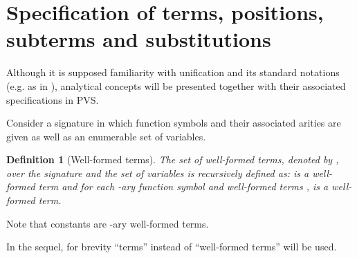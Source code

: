 \documentclass[submission,copyright,creativecommons]{eptcs}
\newtheorem{definition}{Definition}
\begin{document}
\section{Specification of terms, positions, subterms and
  substitutions}\label{Sec:specification}

Although it is supposed familiarity with unification and its standard
notations (e.g. as in \cite{BaNi98,Te2003}), analytical concepts will
be presented together with their associated specifications in PVS.

Consider a signature  in which function symbols and their
associated arities are given as well as an enumerable set  of
variables.

\begin{definition}[Well-formed terms]
  The set of well-formed terms, denoted by , over the
  signature  and the set  of variables is recursively
  defined as:  is a well-formed term and  for each
  -ary function symbol  and well-formed terms
  ,  is a well-formed term.
\end{definition}

Note that constants are -ary well-formed terms.

In the sequel, for brevity ``terms'' instead of ``well-formed terms''
will be used.
\end{document}
